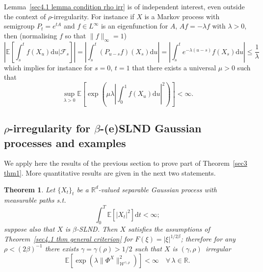 \documentclass[10pt]{article}
\newcommand{\mathd}{\mathrm{d}}
\newcommand{\nobracket}{}
\newtheorem{theorem}{Theorem}
\begin{document}
\begin{remark}
  Lemma~\ref{sec4.1 lemma condition rho irr} is of independent interest, even
  outside the context of $\rho$\mbox{-}irregularity. For instance if $X$ is a
  Markov process with semigroup $P_t = e^{t A}$ and $f \in L^{\infty}$ is an
  eigenfunction for $A$, $A f = - \lambda f$ with $\lambda > 0$, then
  (normalising $f$ so that $\| f \|_{\infty} = 1$)
  \[ \left| \mathbb{E} \left[ \int_s^t f (X_u) \mathd u | \mathcal{F}_s
     \nobracket \right] \right| = \left| \int_s^t (P_{u - s} f) (X_s) \mathd u
     \right| = \left| \int_s^t e^{- \lambda (u - s)} f (X_s) \mathd u \right|
     \leqslant \frac{1}{\lambda} \]
  which implies for instance for $s = 0$, $t = 1$ that there exists a
  universal $\mu > 0$ such that
  \[ \sup_{\lambda > 0} \mathbb{E} \left[ \exp \left( \mu \lambda \left|
     \int_0^1 f (X_u) \mathd u \right|^2 \right) \right] < \infty . \]
\end{remark}

\subsection{$\rho$\mbox{-}irregularity for $\beta$\mbox{-}(e)SLND Gaussian
processes and examples}\label{sec4.2}

We apply here the results of the previous section to prove part of
Theorem~\ref{sec3 thm1}. More quantitative results are given in the next two
statements.

\begin{theorem}
  \label{sec4.2 corollary rho gaussian}Let $\{ X_t \}_t$ be a
  $\mathbb{R}^d$-valued separable Gaussian process with measurable paths s.t.
  \begin{equation}
    \int_0^T \mathbb{E} [| X_t |^2] \mathd t < \infty ; \label{sec4.2 gaussian
    integrability condition}
  \end{equation}
  suppose also that $X$ is $\beta$\mbox{-}SLND. Then $X$ satisfies the
  assumptions of Theorem~\ref{sec4.1 thm general criterion} for $F (\xi) = |
  \xi |^{1 / 2 \beta}$; therefore for any $\rho < (2 \beta)^{- 1}$ there
  exists $\gamma = \gamma (\rho) > 1 / 2$ such that $X$ is $(\gamma,
  \rho)$~irregular
  \[ \mathbb{E} [\exp (\lambda \| \Phi^X \|_{\mathcal{W}^{\gamma, \rho}}^2)] <
     \infty \quad \forall \, \lambda \in \mathbb{R}. \]
\end{theorem}
\end{document}
